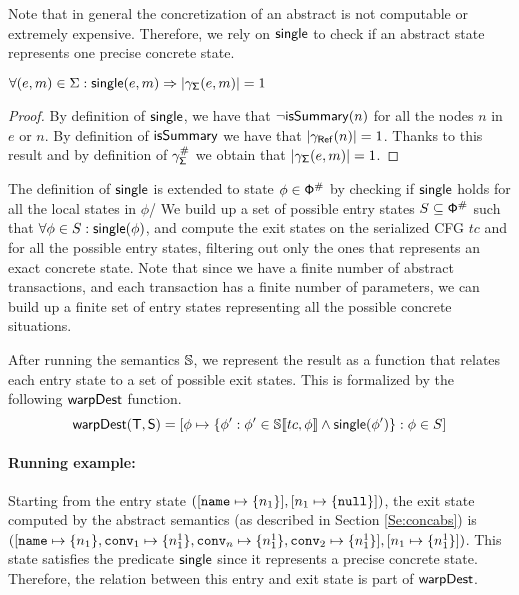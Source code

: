 Note that in general the concretization of an abstract is not computable or extremely expensive. Therefore, we rely on $\mathsf{single}$ to check if an abstract state represents one precise concrete state.

\begin{lemma}
	\label{lemma:singleconcretization}
	$\forall (e, m) \in \Sigma : \mathsf{single}(e, m) \Rightarrow |\gamma_{\mathsf{\Sigma}}(e, m)|=1$
\end{lemma}
\begin{proof}
 By definition of $\mathsf{single}$, we have that $\neg \mathsf{isSummary}(n)$ for all the nodes $n$ in $e$ or $n$. By definition of $\mathsf{isSummary}$ we have that $|\gamma_{\mathsf{Ref}}(n)|=1$. Thanks to this result and by definition of $\gamma_{\mathsf{\Sigma}}^\#$ we obtain that $|\gamma_{\mathsf{\Sigma}}(e, m)|=1$.
\end{proof}

The definition of $\mathsf{single}$ is extended to state $\phi \in \mathsf{\mathsf{\Phi}}^\#$ by checking if $\mathsf{single}$ holds for all the local states in $\phi$/
We build up a set of possible entry states $S \subseteq \mathsf{\mathsf{\Phi}}^\#$ such that $\forall \phi \in S : \mathsf{single}(\phi)$, and compute the exit states on the serialized CFG $tc$ and for all the possible entry states, filtering out only the ones that represents an exact concrete state. Note that since we have a finite number of abstract transactions, and each transaction has a finite number of parameters, we can build up a finite set of entry states representing all the possible concrete situations.

After running the semantics $\mathbb{S}$, we represent the result as a function that relates each entry state to a set of possible exit states. This is formalized by the following $\mathsf{warpDest}$ function.
\[
\mathsf{warpDest}(\mathsf{T}, \mathsf{S}) =[\phi \mapsto \{ \phi': \phi' \in \mathbb{S}\llbracket tc, \phi \rrbracket \land
\mathsf{single}(\phi')\} : \phi \in S]
\]

\paragraph{Running example:} Starting from the entry state $([\mathtt{name} \mapsto \{n_1\}], [n_1 \mapsto \{\mathtt{null}\}])$, the exit state computed by the abstract semantics (as described in Section \ref{Se:concabs}) is
$([\mathtt{name} \mapsto \{n_1\}, \mathtt{conv}_1 \mapsto \{n^1_1\}, \mathtt{conv}_n \mapsto \{n^1_1\}, \mathtt{conv}_2 \mapsto \{n^1_1\}], [n_1 \mapsto \{n^1_1\}])$. This state satisfies the predicate $\mathsf{single}$ since it represents a precise concrete state. Therefore, the relation between this entry and exit state is part of $\mathsf{warpDest}$.

